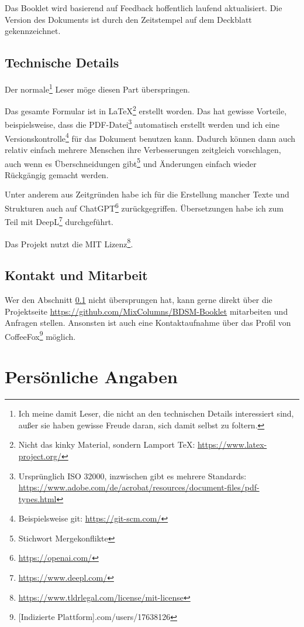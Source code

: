 \documentclass[a4paper,12pt]{article}
\begin{document}
Das Booklet wird basierend auf Feedback hoffentlich\textsuperscript{\texttrademark} laufend aktualisiert. Die Version des Dokuments ist durch den Zeitstempel auf dem Deckblatt gekennzeichnet.

\subsection{Technische Details}\label{Technische_Details}
Der \glqq normale\grqq\footnote{Ich meine damit Leser, die nicht an den technischen Details interessiert sind, außer sie haben gewisse Freude daran, sich damit selbst zu foltern.} Leser möge diesen Part überspringen.

Das gesamte Formular ist in \LaTeX\footnote{Nicht das kinky Material, sondern Lamport TeX: \url{https://www.latex-project.org/}} erstellt worden. Das hat gewisse Vorteile, beispielsweise, dass die PDF-Datei\footnote{Ursprünglich ISO 32000, inzwischen gibt es mehrere Standards: \url{https://www.adobe.com/de/acrobat/resources/document-files/pdf-types.html}} automatisch erstellt werden und ich eine Versionskontrolle\footnote{Beispielsweise git: \url{https://git-scm.com/}} für das Dokument benutzen kann. Dadurch können dann auch relativ einfach mehrere Menschen ihre Verbesserungen zeitgleich vorschlagen, auch wenn es Überschneidungen gibt\footnote{Stichwort Mergekonflikte} und Änderungen einfach wieder Rückgängig gemacht werden.

Unter anderem aus Zeitgründen habe ich für die Erstellung mancher Texte und Strukturen auch auf ChatGPT\footnote{\url{https://openai.com/}} zurückgegriffen. Übersetzungen habe ich zum Teil mit DeepL\footnote{\url{https://www.deepl.com/}} durchgeführt.

Das Projekt nutzt die MIT Lizenz\footnote{\url{https://www.tldrlegal.com/license/mit-license}}.

\subsection{Kontakt und Mitarbeit}
Wer den Abschnitt \ref{Technische_Details} nicht übersprungen hat, kann gerne direkt über die Projektseite \url{https://github.com/MixColumns/BDSM-Booklet} mitarbeiten und Anfragen stellen. Ansonsten ist auch eine Kontaktaufnahme über das Profil von CoffeeFox\footnote{[Indizierte Plattform].com/users/17638126} möglich.


\newpage
\section{Persönliche Angaben}
\end{document}
